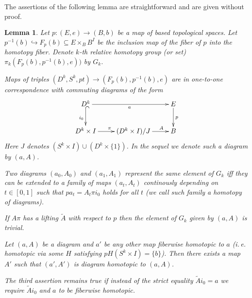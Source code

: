 \documentclass[oneside, 12pt]{amsart}
\theoremstyle{plain}
\numberwithin{equation}{section}
\newtheorem{lemma}{Lemma}
\numberwithin{lemma}{section}
\theoremstyle{remark}
\theoremstyle{definition}
\begin{document}
The assertions of the following lemma are straightforward and are given without proof.
\begin{lemma} \label{lem:topo-facts} Let $p\colon (E, e) \to (B, b)$ be a map of based topological spaces.
Let $p^{-1}(b) \hookrightarrow F_{p}(b) \subseteq E\times_B B^I$ be the inclusion map of the fiber of $p$ into the homotopy fiber.
Denote $k$-th relative homotopy group (or set) $\pi_k(F_p(b), p^{-1}(b), e))$ by $G_k$.
\begin{lemlist}
 \item Maps of triples $(D^k, S^k, pt) \to (F_p(b), p^{-1}(b), e)$ are in one-to-one correspondence with commuting diagrams of the form
   \begin{equation} \xymatrix{ 
    D^k \ar@{^{(}->}_{i_0}[d]  \ar_{a}[rr] & & E \ar^{p}[d]  \\
    D^k\times I \ar^{\pi}[r] & (D^k \times I) / J \ar^(.7){A}[r] & B}
    \label{eq:plp} \end{equation}
    Here $J$ denotes $(S^k \times I) \cup (D^k \times \{1\})$. In the sequel we denote such a diagram by $(a, A)$.
 \item Two diagrams $(a_0, A_0)$ and $(a_1, A_1)$ represent the same element of $G_k$ iff they can be extended to a family of maps $(a_t, A_t)$
     continously depending on $t\in [0, 1]$ such that $pa_t = A_t \pi i_0$ holds for all $t$ (we call such family a homotopy of diagrams).
 \item If $A\pi$ has a lifting $\widetilde{A}$ with respect to $p$ %
     then the element of $G_k$ given by $(a, A)$ is trivial.
 \item \label{item:continue} Let $(a, A)$ be a diagram and $a'$ be any other map fiberwise homotopic to $a$ 
     (i.\,e. homotopic via some $H$ satisfying $pH(S^k\times I) = \{b\}$).
     Then there exists a map $A'$ such that $(a', A')$ is diagram homotopic to $(a, A)$.
 \item \label{item:weaker} The third assertion remains true if instead of the strict equality $\widetilde{A} i_0 = a$ 
       we require $\widetilde{A}i_0$ and $a$ to be fiberwise homotopic.
\end{lemlist}
\end{lemma}
\end{document}
